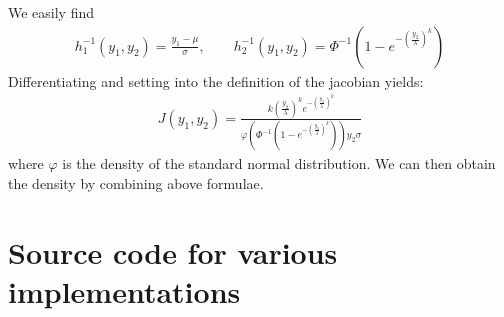 We easily find
\begin{align}
    h_1^{-1}(y_1, y_2) = \frac{y_1-\mu}{\sigma}, \qquad 
    h_2^{-1}(y_1, y_2) = \Phi^{-1}\left(1-e^{-\left(\frac{y_2}{\lambda}\right)^k}\right) 
\end{align}
Differentiating and setting into the definition of the jacobian yields:
\begin{align}
    J(y_1, y_2) = \frac{k\left(\frac{y_2}{\lambda}\right)^ke^{-\left(\frac{y_2}{\lambda}\right)^k}}{\varphi\left(\Phi^{-1}\left(1-e^{-\left(\frac{y_2}{\lambda}\right)^k}\right)\right)y_2\sigma }    
\end{align}
where $\varphi$ is the density of the standard normal distribution. We can then obtain the density by combining above formulae.
\newpage
\section{Source code for various implementations}\label{sourceCodeImplementation}
